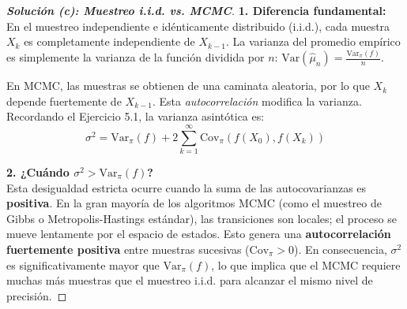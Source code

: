 \documentclass[10pt,a4paper]{article}
\begin{document}
\vspace{5mm}

\begin{proof}[\textbf{Solución (c): Muestreo i.i.d. vs. MCMC}]
    \textbf{1. Diferencia fundamental:} \\
    En el muestreo independiente e idénticamente distribuido (i.i.d.), cada muestra $X_k$ es completamente independiente de $X_{k-1}$. La varianza del promedio empírico es simplemente la varianza de la función dividida por $n$: $\text{Var}(\hat{\mu}_n) = \frac{\text{Var}_\pi(f)}{n}$.
    
    En MCMC, las muestras se obtienen de una caminata aleatoria, por lo que $X_k$ depende fuertemente de $X_{k-1}$. Esta \textit{autocorrelación} modifica la varianza. Recordando el Ejercicio 5.1, la varianza asintótica es:
    \[ \sigma^2 = \text{Var}_\pi(f) + 2 \sum_{k=1}^\infty \text{Cov}_\pi(f(X_0), f(X_k)) \]
    
    \textbf{2. ¿Cuándo $\sigma^2 > \text{Var}_\pi(f)$?} \\
    Esta desigualdad estricta ocurre cuando la suma de las autocovarianzas es \textbf{positiva}. 
    En la gran mayoría de los algoritmos MCMC (como el muestreo de Gibbs o Metropolis-Hastings estándar), las transiciones son locales; el proceso se mueve lentamente por el espacio de estados. Esto genera una \textbf{autocorrelación fuertemente positiva} entre muestras sucesivas ($\text{Cov}_\pi > 0$).
    En consecuencia, $\sigma^2$ es significativamente mayor que $\text{Var}_\pi(f)$, lo que implica que el MCMC requiere muchas más muestras que el muestreo i.i.d. para alcanzar el mismo nivel de precisión.
\end{proof}

\vspace{5mm}
\end{document}
